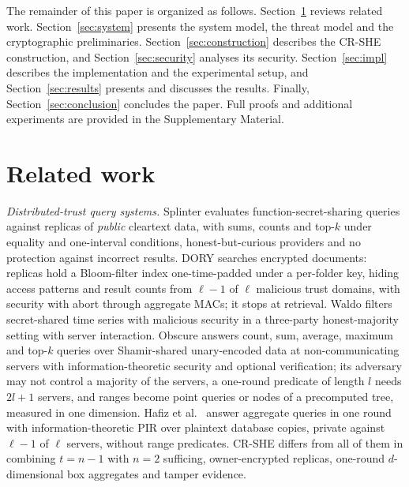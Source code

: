The remainder of this paper is organized as follows.
Section~\ref{sec:related} reviews related work. Section~\ref{sec:system}
presents the system model, the threat model and the cryptographic
preliminaries. Section~\ref{sec:construction} describes the CR-SHE
construction, and Section~\ref{sec:security} analyses its security.
Section~\ref{sec:impl} describes the implementation and the experimental
setup, and Section~\ref{sec:results} presents and discusses the results.
Finally, Section~\ref{sec:conclusion} concludes the paper. Full proofs and
additional experiments are provided in the Supplementary Material.

\section{Related work}
\label{sec:related}

\emph{Distributed-trust query systems.} Splinter \citep{splinter} evaluates
function-secret-sharing queries against replicas of \emph{public} cleartext
data, with sums, counts and top-$k$ under equality and one-interval conditions,
honest-but-curious providers and no protection against incorrect results.
DORY \citep{dory} searches encrypted documents: replicas hold a Bloom-filter
index one-time-padded under a per-folder key, hiding access patterns and result
counts from $\ell-1$ of $\ell$ malicious trust domains, with security with
abort through aggregate MACs; it stops at retrieval. Waldo \citep{waldo}
filters secret-shared time series with malicious security in a three-party
honest-majority setting with server interaction. Obscure
\citep{gupta2019obscure,gupta2020obscure} answers count, sum, average, maximum
and top-$k$ queries over Shamir-shared unary-encoded data at non-communicating
servers with information-theoretic security and optional verification; its
adversary may not control a majority of the servers, a one-round predicate of
length $l$ needs $2l+1$ servers, and ranges become point queries or nodes of a
precomputed tree, measured in one dimension. Hafiz et al.\
\citep{hafiz2024private} answer aggregate queries in one round with
information-theoretic PIR over plaintext database copies, private against
$\ell-1$ of $\ell$ servers, without range predicates. CR-SHE differs from all
of them in combining $t=n-1$ with $n=2$ sufficing, owner-encrypted replicas,
one-round $d$-dimensional box aggregates and tamper evidence.

